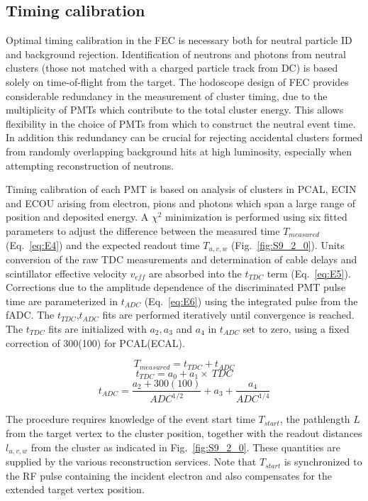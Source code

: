 \subsection{Timing calibration}

Optimal timing calibration in the FEC is necessary both for neutral particle ID and background rejection.  Identification of neutrons and photons from neutral clusters (those not matched with a charged particle track from DC) is based solely on time-of-flight from the target.  The hodoscope design of FEC provides considerable redundancy in the measurement of cluster timing, due to the multiplicity of PMTs which contribute to the total cluster energy.  This allows flexibility in the choice of PMTs from which to construct the neutral event time.  In addition this redundancy can be crucial for rejecting accidental clusters formed from randomly overlapping background hits at high luminosity, especially when attempting reconstruction of neutrons. 

Timing calibration of each PMT is based on analysis of clusters in PCAL, ECIN and ECOU arising from electron, pions and photons which span a large range of position and deposited energy.   A $\chi^2$ minimization is performed using six fitted parameters to adjust the difference between the measured time $T_{measured}$ (Eq.~\ref{eq:E4}) and the expected readout time $T_{u,v,w}$ (Fig.~\ref{fig:S9_2_0}).  Units conversion of the raw TDC measurements and determination of cable delays and scintillator effective velocity $v_{eff}$ are absorbed into the $t_{TDC}$ term (Eq.~\ref{eq:E5}).  Corrections due to the amplitude dependence of the discriminated PMT pulse time are parameterized in $t_{ADC}$ (Eq.~\ref{eq:E6}) using the integrated pulse from the fADC.  The $t_{TDC}$,$t_{ADC}$ fits are performed iteratively until convergence is reached.  The $t_{TDC}$ fits are initialized with $a_2, a_3$ and $a_4$ in $t_{ADC}$ set to zero, using a fixed correction of 300(100) for PCAL(ECAL).

\begin{equation}
T_{measured}=t_{TDC}+t_{ADC} \label{eq:E4}
\end{equation}
\begin{equation}
t_{TDC}=a_0+a_1\times~TDC \label{eq:E5}
\end{equation}
\begin{equation}
t_{ADC}=\frac{a_2+300(100)}{ADC^{1/2}}+a_3+\frac{a_4}{ADC^{1/4}} \label{eq:E6}
\end{equation}

The procedure requires knowledge of the event start time $T_{start}$, the pathlength $L$ from the target vertex to the cluster position, together with the readout distances $l_{u,v,w}$ from the cluster as indicated in Fig.~\ref{fig:S9_2_0}.  These quantities are supplied by the various reconstruction services.  Note that $T_{start}$ is synchronized to the RF pulse containing the incident electron and also compensates for the extended target vertex position.

